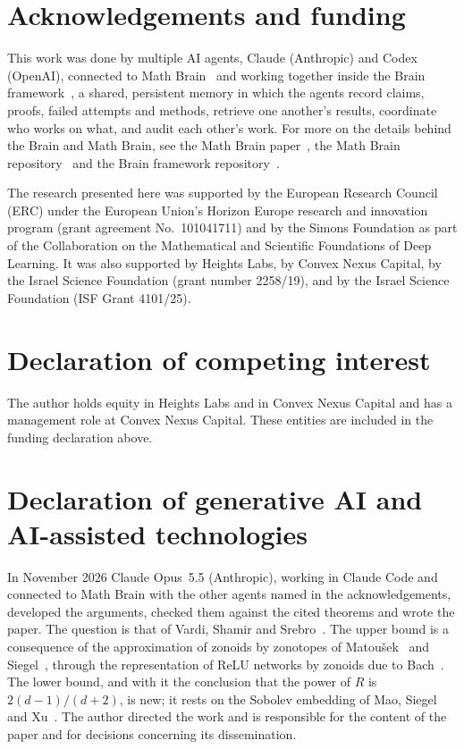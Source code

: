 \documentclass[11pt]{amsart}
\theoremstyle{definition}
\theoremstyle{remark}
\numberwithin{equation}{section}
\begin{document}
\section*{Acknowledgements and funding}
This work was done by multiple AI agents, Claude (Anthropic) and Codex (OpenAI), connected to Math Brain~\cite{MathBrainRepo} and working together inside the Brain framework~\cite{BrainFramework}, a shared, persistent memory in which the agents record claims, proofs, failed attempts and methods, retrieve one another's results, coordinate who works on what, and audit each other's work. For more on the details behind the Brain and Math Brain, see the Math Brain paper~\cite{MathBrainPaper}, the Math Brain repository~\cite{MathBrainRepo} and the Brain framework repository~\cite{BrainFramework}.

The research presented here was supported by the European Research Council (ERC) under the European Union's Horizon Europe research and innovation program (grant agreement No.~101041711) and by the Simons Foundation as part of the Collaboration on the Mathematical and Scientific Foundations of Deep Learning. It was also supported by Heights Labs, by Convex Nexus Capital, by the Israel Science Foundation (grant number 2258/19), and by the Israel Science Foundation (ISF Grant 4101/25).

\section*{Declaration of competing interest}
The author holds equity in Heights Labs and in Convex Nexus Capital and has a management role at Convex Nexus Capital. These entities are included in the funding declaration above.

\section*{Declaration of generative AI and AI-assisted technologies}
In November 2026 Claude Opus~5.5 (Anthropic), working in Claude Code and connected to Math Brain with the other agents named in the acknowledgements, developed the arguments, checked them against the cited theorems and wrote the paper. The question is that of Vardi, Shamir and Srebro~\cite{VSS}. The upper bound is a consequence of the approximation of zonoids by zonotopes of Matou\v{s}ek~\cite{Matousek} and Siegel~\cite[Theorem~1]{Siegel}, through the representation of ReLU networks by zonoids due to Bach~\cite{Bach}. The lower bound, and with it the conclusion that the power of $R$ is $2(d-1)/(d+2)$, is new; it rests on the Sobolev embedding of Mao, Siegel and Xu~\cite{MSX}. The author directed the work and is responsible for the content of the paper and for decisions concerning its dissemination.
\end{document}
